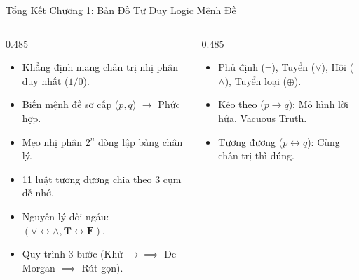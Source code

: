 \documentclass[aspectratio=169, 10pt]{beamer}
\begin{document}
\begin{frame}{Tổng Kết Chương 1: Bản Đồ Tư Duy Logic Mệnh Đề}
  \begin{columns}[t, onlytextwidth]
    \begin{column}{0.485\textwidth}
      \begin{cozyDef}
        \footnotesize
        \begin{itemize}
          \setlength{\itemsep}{0.5pt}
          \item Khẳng định mang chân trị nhị phân duy nhất ($1/0$).
          \item Biến mệnh đề sơ cấp ($p, q$) $\to$ Phức hợp.
          \item Mẹo nhị phân $2^n$ dòng lập bảng chân lý.
        \end{itemize}
      \end{cozyDef}
      \vspace{0.04cm}
      \begin{cozyMethod}
        \footnotesize
        \begin{itemize}
          \setlength{\itemsep}{0.5pt}
          \item 11 luật tương đương chia theo 3 cụm dễ nhớ.
          \item Nguyên lý đối ngẫu: $(\lor \leftrightarrow \land, \mathbf{T} \leftrightarrow \mathbf{F})$.
          \item Quy trình 3 bước (Khử $\to \implies$ De Morgan $\implies$ Rút gọn).
        \end{itemize}
      \end{cozyMethod}
    \end{column}
    \begin{column}{0.485\textwidth}
      \begin{cozyInsight}
        \footnotesize
        \begin{itemize}
          \setlength{\itemsep}{0.5pt}
          \item Phủ định ($\neg$), Tuyển ($\lor$), Hội ($\land$), Tuyển loại ($\oplus$).
          \item Kéo theo ($p \to q$): Mô hình lời hứa, Vacuous Truth.
          \item Tương đương ($p \leftrightarrow q$): Cùng chân trị thì đúng.
        \end{itemize}
      \end{cozyInsight}
      \vspace{0.04cm}
      \begin{cozyTrap}

\end{cozyTrap}
\end{column}
\end{columns}
\end{frame}
\end{document}
